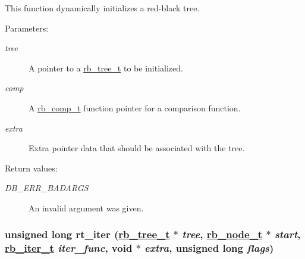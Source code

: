 This function dynamically initializes a red-black tree.\begin{Desc}
\item[Parameters: ]\par
\begin{description}
\item[{\em 
tree}]A pointer to a \hyperlink{group__dbprim__rbtree_a0}{rb\_\-tree\_\-t} to be initialized. \item[{\em 
comp}]A \hyperlink{group__dbprim__rbtree_a3}{rb\_\-comp\_\-t} function pointer for a comparison function. \item[{\em 
extra}]Extra pointer data that should be associated with the tree.\end{description}
\end{Desc}
\begin{Desc}
\item[Return values: ]\par
\begin{description}
\item[{\em 
DB\_\-ERR\_\-BADARGS}]An invalid argument was given. \end{description}
\end{Desc}
\hypertarget{group__dbprim__rbtree_a11}{
\subsubsection[rt\_\-iter]{\setlength{\rightskip}{0pt plus 5cm}unsigned long rt\_\-iter (\hyperlink{group__dbprim__rbtree_a0}{rb\_\-tree\_\-t} $\ast$ {\em tree}, \hyperlink{group__dbprim__rbtree_a1}{rb\_\-node\_\-t} $\ast$ {\em start}, \hyperlink{group__dbprim__rbtree_a2}{rb\_\-iter\_\-t} {\em iter\_\-func}, void $\ast$ {\em extra}, unsigned long {\em flags})}}
\label{group__dbprim__rbtree_a11}


